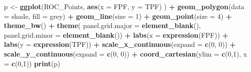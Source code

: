 \documentclass[
]{book}
\newenvironment{Shaded}{\begin{snugshade}}{\end{snugshade}}
\newcommand{\DataTypeTok}[1]{\textcolor[rgb]{0.13,0.29,0.53}{#1}}
\newcommand{\DecValTok}[1]{\textcolor[rgb]{0.00,0.00,0.81}{#1}}
\newcommand{\KeywordTok}[1]{\textcolor[rgb]{0.13,0.29,0.53}{\textbf{#1}}}
\newcommand{\NormalTok}[1]{#1}
\newcommand{\OperatorTok}[1]{\textcolor[rgb]{0.81,0.36,0.00}{\textbf{#1}}}
\newcommand{\StringTok}[1]{\textcolor[rgb]{0.31,0.60,0.02}{#1}}
\begin{document}
\begin{Shaded}
\begin{Highlighting}[]
\NormalTok{p \textless{}{-}}\StringTok{ }\KeywordTok{ggplot}\NormalTok{(ROC\_Points, }
            \KeywordTok{aes}\NormalTok{(}\DataTypeTok{x =}\NormalTok{ FPF, }\DataTypeTok{y =}\NormalTok{ TPF) ) }\OperatorTok{+}\StringTok{ }
\StringTok{  }\KeywordTok{geom\_polygon}\NormalTok{(}\DataTypeTok{data =}\NormalTok{ shade, }\DataTypeTok{fill =} \StringTok{\textquotesingle{}grey\textquotesingle{}}\NormalTok{) }\OperatorTok{+}\StringTok{ }
\StringTok{  }\KeywordTok{geom\_line}\NormalTok{(}\DataTypeTok{size =} \DecValTok{1}\NormalTok{) }\OperatorTok{+}\StringTok{ }
\StringTok{  }\KeywordTok{geom\_point}\NormalTok{(}\DataTypeTok{size =} \DecValTok{4}\NormalTok{) }\OperatorTok{+}\StringTok{ }
\StringTok{  }\KeywordTok{theme\_bw}\NormalTok{() }\OperatorTok{+}\StringTok{ }
\StringTok{  }\KeywordTok{theme}\NormalTok{(}
    \DataTypeTok{panel.grid.major =} \KeywordTok{element\_blank}\NormalTok{(), }
    \DataTypeTok{panel.grid.minor =} \KeywordTok{element\_blank}\NormalTok{()) }\OperatorTok{+}
\StringTok{  }\KeywordTok{labs}\NormalTok{(}\DataTypeTok{x =} \KeywordTok{expression}\NormalTok{(FPF)) }\OperatorTok{+}\StringTok{ }
\StringTok{  }\KeywordTok{labs}\NormalTok{(}\DataTypeTok{y =} \KeywordTok{expression}\NormalTok{(TPF)) }\OperatorTok{+}\StringTok{ }
\StringTok{  }\KeywordTok{scale\_x\_continuous}\NormalTok{(}\DataTypeTok{expand =} \KeywordTok{c}\NormalTok{(}\DecValTok{0}\NormalTok{, }\DecValTok{0}\NormalTok{)) }\OperatorTok{+}\StringTok{ }
\StringTok{  }\KeywordTok{scale\_y\_continuous}\NormalTok{(}\DataTypeTok{expand =} \KeywordTok{c}\NormalTok{(}\DecValTok{0}\NormalTok{, }\DecValTok{0}\NormalTok{)) }\OperatorTok{+}\StringTok{ }
\StringTok{  }\KeywordTok{coord\_cartesian}\NormalTok{(}\DataTypeTok{ylim =} \KeywordTok{c}\NormalTok{(}\DecValTok{0}\NormalTok{,}\DecValTok{1}\NormalTok{), }\DataTypeTok{x =} \KeywordTok{c}\NormalTok{(}\DecValTok{0}\NormalTok{,}\DecValTok{1}\NormalTok{))}
\KeywordTok{print}\NormalTok{(p)}
\end{Highlighting}
\end{Shaded}
\end{document}
